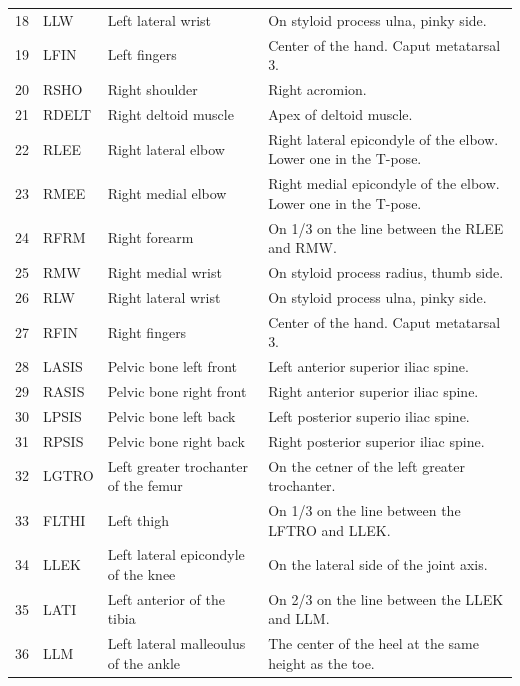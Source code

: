 \documentclass{article}
\begin{document}
\begin{table}
\begin{tabular}{rlll}
    18 & LLW   & Left lateral wrist                    & On styloid process ulna, pinky side. \\
    19 & LFIN  & Left fingers                          & Center of the hand. Caput metatarsal 3. \\
    20 & RSHO  & Right shoulder                        & Right acromion. \\
    21 & RDELT & Right deltoid muscle                  & Apex of deltoid muscle. \\
    22 & RLEE  & Right lateral elbow                   & Right lateral epicondyle of the elbow. Lower one in the T-pose. \\
    23 & RMEE  & Right medial elbow                    & Right medial epicondyle of the elbow. Lower one in the T-pose. \\
    24 & RFRM  & Right forearm                         & On 1/3 on the line between the RLEE and RMW. \\
    25 & RMW   & Right medial wrist                    & On styloid process radius, thumb side. \\
    26 & RLW   & Right lateral wrist                   & On styloid process ulna, pinky side. \\
    27 & RFIN  & Right fingers                         & Center of the hand. Caput metatarsal 3. \\
    28 & LASIS & Pelvic bone left front                & Left anterior superior iliac spine. \\
    29 & RASIS & Pelvic bone right front               & Right anterior superior iliac spine. \\
    30 & LPSIS & Pelvic bone left back                 & Left posterior superio iliac spine. \\
    31 & RPSIS & Pelvic bone right back                & Right posterior superior iliac spine. \\
    32 & LGTRO & Left greater trochanter of the femur  & On the cetner of the left greater trochanter. \\
    33 & FLTHI & Left thigh                            & On 1/3 on the line between the LFTRO and LLEK. \\
    34 & LLEK  & Left lateral epicondyle of the knee   & On the lateral side of the joint axis. \\
    35 & LATI  & Left anterior of the tibia            & On 2/3 on the line between the LLEK and LLM. \\
    36 & LLM   & Left lateral malleoulus of the ankle  & The center of the heel at the same height as the toe. \\

\end{tabular}
\end{table}
\end{document}
